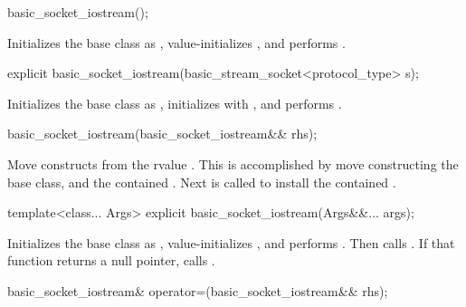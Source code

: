 \begin{itemdecl}
basic_socket_iostream();
\end{itemdecl}

\begin{itemdescr}
\pnum
\effects Initializes the base class as , value-initializes , and performs .
\end{itemdescr}

\begin{itemdecl}
explicit basic_socket_iostream(basic_stream_socket<protocol_type> s);
\end{itemdecl}

\begin{itemdescr}
\pnum
\effects Initializes the base class as , initializes  with , and performs .
\end{itemdescr}

\begin{itemdecl}
basic_socket_iostream(basic_socket_iostream&& rhs);
\end{itemdecl}

\begin{itemdescr}
\pnum
\effects Move constructs from the rvalue . This is accomplished by move constructing the base class, and the contained . Next  is called to install the contained .
\end{itemdescr}

\begin{itemdecl}
template<class... Args>
  explicit basic_socket_iostream(Args&&... args);
\end{itemdecl}

\begin{itemdescr}
\pnum
\effects Initializes the base class as , value-initializes , and performs . Then calls . If that function returns a null pointer, calls .
\end{itemdescr}

\begin{itemdecl}
basic_socket_iostream& operator=(basic_socket_iostream&& rhs);
\end{itemdecl}

